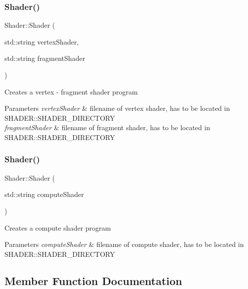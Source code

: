 \subsubsection{\texorpdfstring{Shader()}{Shader()}\hspace{0.1cm}{\footnotesize\ttfamily [1/2]}}
{\footnotesize\ttfamily Shader\+::\+Shader (\begin{DoxyParamCaption}\item[{std\+::string}]{vertex\+Shader,  }\item[{std\+::string}]{fragment\+Shader }\end{DoxyParamCaption})}

Creates a vertex -\/ fragment shader program


\begin{DoxyParams}{Parameters}
{\em vertex\+Shader} & filename of vertex shader, has to be located in S\+H\+A\+D\+E\+R\+::\+S\+H\+A\+D\+E\+R\+\_\+\+D\+I\+R\+E\+C\+T\+O\+RY \\
\hline
{\em fragment\+Shader} & filename of fragment shader, has to be located in S\+H\+A\+D\+E\+R\+::\+S\+H\+A\+D\+E\+R\+\_\+\+D\+I\+R\+E\+C\+T\+O\+RY \\
\hline
\end{DoxyParams}
\mbox{\label{class_shader_a59d00e31f9c5cb3dc0dc3dc2b3f4fe75}} 
\subsubsection{\texorpdfstring{Shader()}{Shader()}\hspace{0.1cm}{\footnotesize\ttfamily [2/2]}}
{\footnotesize\ttfamily Shader\+::\+Shader (\begin{DoxyParamCaption}\item[{std\+::string}]{compute\+Shader }\end{DoxyParamCaption})}

Creates a compute shader program


\begin{DoxyParams}{Parameters}
{\em compute\+Shader} & filename of compute shader, has to be located in S\+H\+A\+D\+E\+R\+::\+S\+H\+A\+D\+E\+R\+\_\+\+D\+I\+R\+E\+C\+T\+O\+RY \\
\hline
\end{DoxyParams}


\subsection{Member Function Documentation}
\mbox{\label{class_shader_a68198848608bdc77bf3458f012fc0254}} 
